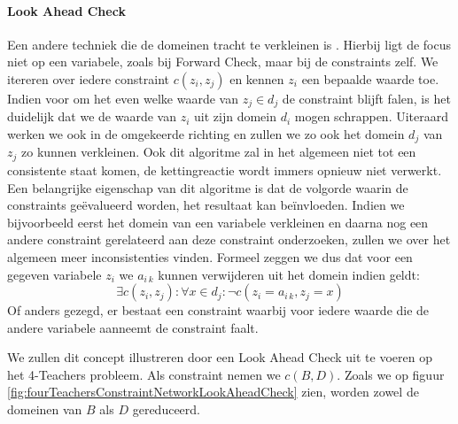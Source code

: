 \paragraph{Look Ahead Check}
Een andere techniek die de domeinen tracht te verkleinen is . Hierbij ligt de focus niet op een variabele, zoals bij Forward Check, maar bij de constraints zelf. We itereren over iedere constraint $c\left(z_i,z_j\right)$ en kennen $z_i$ een bepaalde waarde toe. Indien voor om het even welke waarde van $z_j\in d_j$ de constraint blijft falen, is het duidelijk dat we de waarde van $z_i$ uit zijn domein $d_i$ mogen schrappen. Uiteraard werken we ook in de omgekeerde richting en zullen we zo ook het domein $d_j$ van $z_j$ zo kunnen verkleinen. Ook dit algoritme zal in het algemeen niet tot een consistente staat komen, de kettingreactie wordt immers opnieuw niet verwerkt. Een belangrijke eigenschap van dit algoritme is dat de volgorde waarin de constraints geëvalueerd worden, het resultaat kan beïnvloeden. Indien we bijvoorbeeld eerst het domein van een variabele verkleinen en daarna nog een andere constraint gerelateerd aan deze constraint onderzoeken, zullen we over het algemeen meer inconsistenties vinden. Formeel zeggen we dus dat voor een gegeven variabele $z_i$ we $a_{i\,k}$ kunnen verwijderen uit het domein indien geldt:
\begin{equation}
\exists c(z_i,z_j):\forall x\in d_j:\neg c\left(z_i=a_{i\,k},z_j=x\right)
\end{equation}
Of anders gezegd, er bestaat een constraint waarbij voor iedere waarde die de andere variabele aanneemt de constraint faalt.
\begin{leftbar}
We zullen dit concept illustreren door een Look Ahead Check uit te voeren op het 4-Teachers probleem. Als constraint nemen we $c\left(B,D\right)$. Zoals we op figuur \ref{fig:fourTeachersConstraintNetworkLookAheadCheck} zien, worden zowel de domeinen van $B$ als $D$ gereduceerd.
\end{leftbar}
